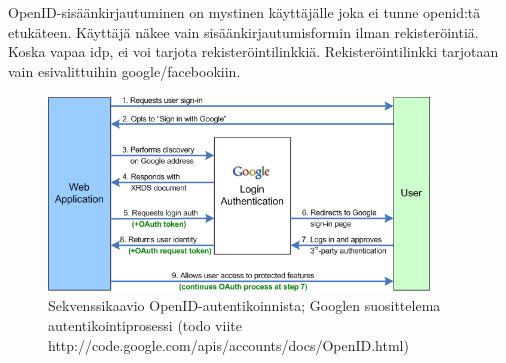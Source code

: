 \documentclass[finnish,gradu]{tktltiki}
\begin{document}
  OpenID-sisäänkirjautuminen on mystinen käyttäjälle joka ei tunne openid:tä etukäteen. Käyttäjä näkee vain sisäänkirjautumisformin ilman rekisteröintiä. Koska vapaa idp, ei voi tarjota rekisteröintilinkkiä. Rekisteröintilinkki tarjotaan vain esivalittuihin google/facebookiin.

  \begin{figure}
    \centering
    \includegraphics[width=0.9\textwidth]{images/google_openid_diagram.png}
    \caption{Sekvenssikaavio OpenID-autentikoinnista; Googlen suosittelema autentikointiprosessi (todo viite http://code.google.com/apis/accounts/docs/OpenID.html)}
    \label{fig:sekvenssikaavio_google_openid}
  \end{figure}
\end{document}
